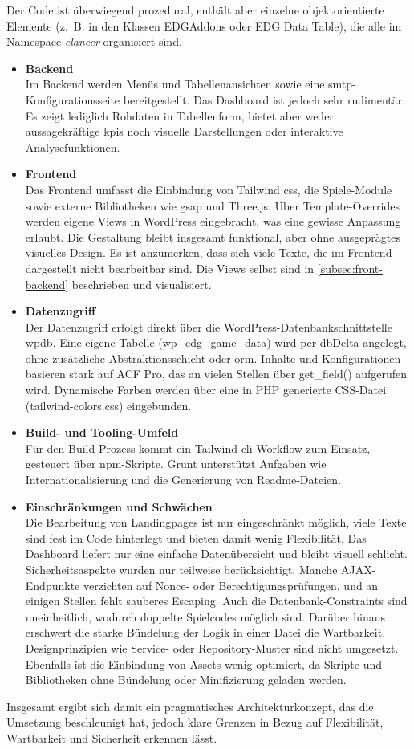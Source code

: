 Der Code ist überwiegend prozedural, enthält aber einzelne objektorientierte Elemente (z.~B. in den Klassen EDGAddons oder EDG Data Table), die alle im Namespace \emph{elancer} organisiert sind.

\begin{itemize}
    \item \textbf{Backend}\\
    Im Backend werden Menüs und Tabellenansichten sowie eine \gls{smtp}-Konfigurationsseite bereitgestellt.
    Das Dashboard ist jedoch sehr rudimentär: Es zeigt lediglich Rohdaten in Tabellenform, bietet aber weder aussagekräftige \gls{kpi}s noch visuelle Darstellungen oder interaktive Analysefunktionen.

    \item \textbf{Frontend}\\
    Das Frontend umfasst die Einbindung von Tailwind \gls{css}, die Spiele-Module sowie externe Bibliotheken wie \gls{gsap} und Three.js.
    Über Template-Overrides werden eigene Views in WordPress eingebracht, was eine gewisse Anpassung erlaubt.
    Die Gestaltung bleibt insgesamt funktional, aber ohne ausgeprägtes visuelles Design.
    Es ist anzumerken, dass sich viele Texte, die im Frontend dargestellt nicht bearbeitbar sind.
    Die Views selbst sind in \ref{subsec:front-backend} beschrieben und visualisiert.

    \item \textbf{Datenzugriff}\\
    Der Datenzugriff erfolgt direkt über die WordPress-Datenbankschnittstelle wpdb.
    Eine eigene Tabelle (wp\_edg\_game\_data) wird per dbDelta angelegt, ohne zusätzliche Abstraktionsschicht oder \gls{orm}.
    Inhalte und Konfigurationen basieren stark auf ACF Pro, das an vielen Stellen über get\_field() aufgerufen wird.
    Dynamische Farben werden über eine in PHP generierte CSS-Datei (tailwind-colors.css) eingebunden.

    \item \textbf{Build- und Tooling-Umfeld}\\
    Für den Build-Prozess kommt ein Tailwind-\gls{cli}-Workflow zum Einsatz, gesteuert über npm-Skripte.
    Grunt unterstützt Aufgaben wie Internationalisierung und die Generierung von Readme-Dateien.

    \item \textbf{Einschränkungen und Schwächen}\\
    Die Bearbeitung von Landingpages ist nur eingeschränkt möglich, viele Texte sind fest im Code hinterlegt und bieten damit wenig Flexibilität.
    Das Dashboard liefert nur eine einfache Datenübersicht und bleibt visuell schlicht.
    Sicherheitsaspekte wurden nur teilweise berücksichtigt.
    Manche AJAX-Endpunkte verzichten auf Nonce- oder Berechtigungsprüfungen, und an einigen Stellen fehlt sauberes Escaping.
    Auch die Datenbank-Constraints sind uneinheitlich, wodurch doppelte Spielcodes möglich sind.
    Darüber hinaus erschwert die starke Bündelung der Logik in einer Datei die Wartbarkeit.
    Designprinzipien wie Service- oder Repository-Muster sind nicht umgesetzt.
    Ebenfalls ist die Einbindung von Assets wenig optimiert, da Skripte und Bibliotheken ohne Bündelung oder Minifizierung geladen werden.
\end{itemize}
\vspace{0.5em}
Insgesamt ergibt sich damit ein pragmatisches Architekturkonzept, das die Umsetzung beschleunigt hat, jedoch klare Grenzen in Bezug auf Flexibilität, Wartbarkeit und Sicherheit erkennen lässt.